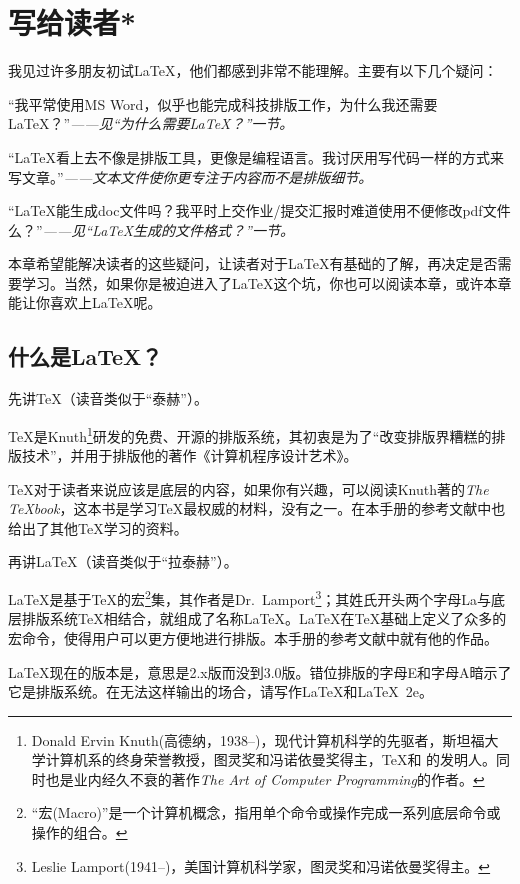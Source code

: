 \chapter{\mbox{写给读者}*}

我见过许多朋友初试\LaTeX ，他们都感到非常不能理解。主要有以下几个疑问：
\begin{feae}
\item “我平常使用MS Word，似乎也能完成科技排版工作，为什么我还需要\LaTeX ？”\hfill \textit{——见“为什么需要\LaTeX ？”一节。}
\item “\LaTeX 看上去不像是排版工具，更像是编程语言。我讨厌用写代码一样的方式来写文章。”\hfill \textit{——文本文件使你更专注于内容而不是排版细节。}
\item “\LaTeX 能生成doc文件吗？我平时上交作业/提交汇报时难道使用不便修改pdf文件么？”\hfill \textit{——见“\LaTeX 生成的文件格式？”一节。}
\end{feae}

本章希望能解决读者的这些疑问，让读者对于\LaTeX 有基础的了解，再决定是否需要学习。当然，如果你是被迫进入了\LaTeX 这个坑，你也可以阅读本章，或许本章能让你喜欢上\LaTeX 呢。

\section{什么是\LaTeX ？}
先讲\TeX （读音类似于“泰赫”）。

\TeX 是Knuth\footnote{Donald Ervin Knuth(高德纳，1938--)，现代计算机科学的先驱者，斯坦福大学计算机系的终身荣誉教授，图灵奖和冯诺依曼奖得主，\TeX 和  的发明人。同时也是业内经久不衰的著作\emph{The Art of Computer Programming}的作者。}研发的免费、开源的排版系统，其初衷是为了“改变排版界糟糕的排版技术”，并用于排版他的著作《计算机程序设计艺术》。

\TeX 对于读者来说应该是底层的内容，如果你有兴趣，可以阅读Knuth著的\emph{The \TeX book}，这本书是学习\TeX 最权威的材料，没有之一。在本手册的参考文献中也给出了其他\TeX 学习的资料。\dpar

再讲\LaTeX （读音类似于“拉泰赫”）。

\LaTeX 是基于\TeX 的宏\footnote{“宏(Macro)”是一个计算机概念，指用单个命令或操作完成一系列底层命令或操作的组合。}集，其作者是Dr.~Lamport\footnote{Leslie Lamport(1941--)，美国计算机科学家，图灵奖和冯诺依曼奖得主。}；其姓氏开头两个字母La与底层排版系统\TeX 相结合，就组成了名称\LaTeX 。\LaTeX 在\TeX 基础上定义了众多的宏命令，使得用户可以更方便地进行排版。本手册的参考文献中就有他的作品。

\LaTeX 现在的版本是\LaTeXe ，意思是2.x版而没到3.0版。错位排版的字母E和字母A暗示了它是排版系统。在无法这样输出的场合，请写作LaTeX和LaTeX~2e。

